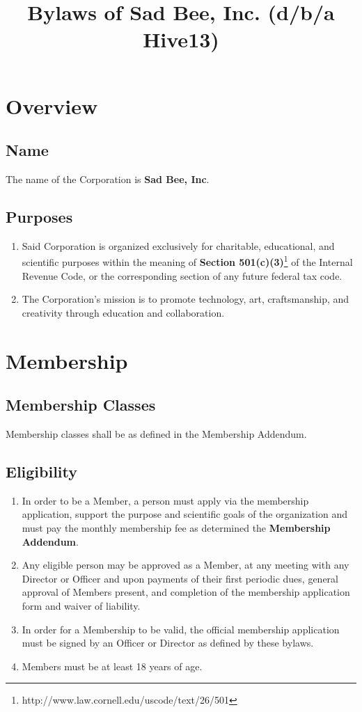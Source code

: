 \documentclass{article}
\title{Bylaws of Sad Bee, Inc. (d/b/a Hive13)}
\begin{document}
\maketitle
\section{Overview}
\subsection{Name}
The name of the Corporation is \textbf{Sad Bee, Inc}.
\subsection{Purposes}
\begin{enumerate}
	\item Said Corporation is organized exclusively for charitable, educational, and scientific purposes within the meaning of \textbf{Section 501(c)(3)}\footnote{http://www.law.cornell.edu/uscode/text/26/501} of the Internal Revenue Code, or the corresponding section of any future federal tax code.
	\item The Corporation’s mission is to promote technology, art, craftsmanship, and creativity through education and collaboration.
\end{enumerate}
\section{Membership}
\subsection{Membership Classes}
    Membership classes shall be as defined in the Membership Addendum.
\subsection{Eligibility}
\begin{enumerate}
    \item In order to be a Member, a person must apply via the membership
    application, support the purpose and scientific goals of the organization
    and must pay the monthly membership fee as determined the \textbf{Membership Addendum}.
    \item Any eligible person may be approved as a Member, at any meeting with
    any Director or Officer and upon payments of their first periodic dues,
    general approval of Members present, and completion of the membership
    application form and waiver of liability.
    \item In order for a Membership to be valid, the official membership
    application must be signed by an Officer or Director as defined by these
    bylaws.
    \item Members must be at least 18 years of age.
\end{enumerate}
\end{document}
